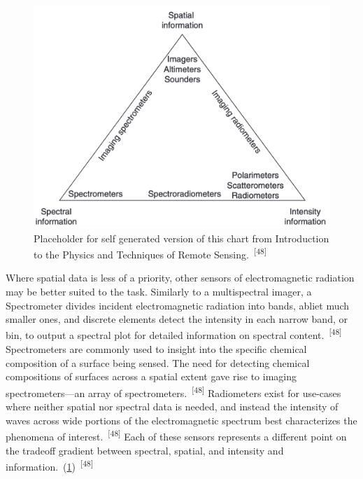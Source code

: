 \documentclass{article}
\begin{document}

\begin{figure}
    \centering
    \includegraphics[width=0.6\linewidth]{images/remote-sensor-tradeoff.png}
    \caption{Placeholder for self generated version of this chart from Introduction to the Physics and Techniques of Remote Sensing.~\textsuperscript{[48]}}
    \label{figure14}
\end{figure}


\par{Where spatial data is less of a priority, other sensors of electromagnetic radiation may be better suited to the task. Similarly to a multispectral imager, a Spectrometer divides incident electromagnetic radiation into bands, abliet much smaller ones, and discrete elements detect the intensity in each narrow band, or bin, to output a spectral plot for detailed information on spectral content.~\textsuperscript{[48]} Spectrometers are commonly used to insight into the specific chemical composition of a surface being sensed. The need for detecting chemical compositions of surfaces across a spatial extent gave rise to imaging spectrometers---an array of spectrometers.~\textsuperscript{[48]} Radiometers exist for use-cases where neither spatial nor spectral data is needed, and instead the intensity of waves across wide portions of the electromagnetic spectrum best characterizes the phenomena of interest.~\textsuperscript{[48]} Each of these sensors represents a different point on the tradeoff gradient between spectral, spatial, and intensity and information.~(\cref{figure14})~\textsuperscript{[48]}}


\end{document}
